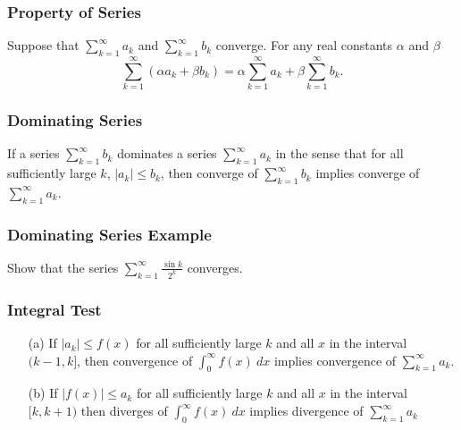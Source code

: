 \documentclass{beamer}
\begin{document}
 \begin{frame}
 \frametitle{Property of Series}
 
 \begin{Theorem} 
 Suppose that $\displaystyle\sum_{k = 1}^\infty a_k$ and $\displaystyle\sum_{k = 1}^\infty b_k$ converge. For any real constants $\alpha$ and $\beta$
 $$
 \sum_{k = 1}^\infty\left( \alpha a_k + \beta b_k\right) =   \alpha \sum_{k = 1}^\infty a_k + \beta \sum_{k = 1}^\infty b_k .
 $$
  \end{Theorem} 
 \end{frame}
 
 
 \begin{frame}
 \frametitle{Dominating Series}
 
 \begin{Theorem}
 If a series $\displaystyle\sum_{k = 1}^\infty b_k$ dominates a series $\displaystyle\sum_{k = 1}^\infty a_k$ in the sense that for all sufficiently large $k$, $|a_k| \leq b_k$, then converge of $\displaystyle\sum_{k = 1}^\infty b_k$ implies converge of $\displaystyle\sum_{k = 1}^\infty a_k$.
 \end{Theorem}
 
 \end{frame}
 
 \begin{frame}[t]
  \frametitle{Dominating Series Example}
  \begin{Example} 
  Show that the series $\displaystyle\sum_{k = 1}^\infty \frac{\sin k}{2^k}$ converges.
  \end{Example}
 
 \end{frame}
 
 \begin{frame}
  \frametitle{Integral Test}
  
  \begin{Theorem}
\begin{enumerate}
\item[(a)] If $|a_k| \leq f(x)$ for all sufficiently large $k$ and all $x$ in the interval $(k - 1, k]$, then convergence of $\displaystyle\int_0^\infty f(x)\ dx$ implies convergence of $\displaystyle\sum_{k = 1}^\infty a_k$.
\item[(b)] If $|f(x)| \leq a_k$ for all sufficiently large $k$ and all $x$ in the interval $[k, k+1)$ then diverges of $\displaystyle\int_0^\infty f(x)\ dx$ implies divergence of $\displaystyle\sum_{k = 1}^\infty a_k$
\end{enumerate}
\end{Theorem}
  
  \end{frame}
  
\end{document}
